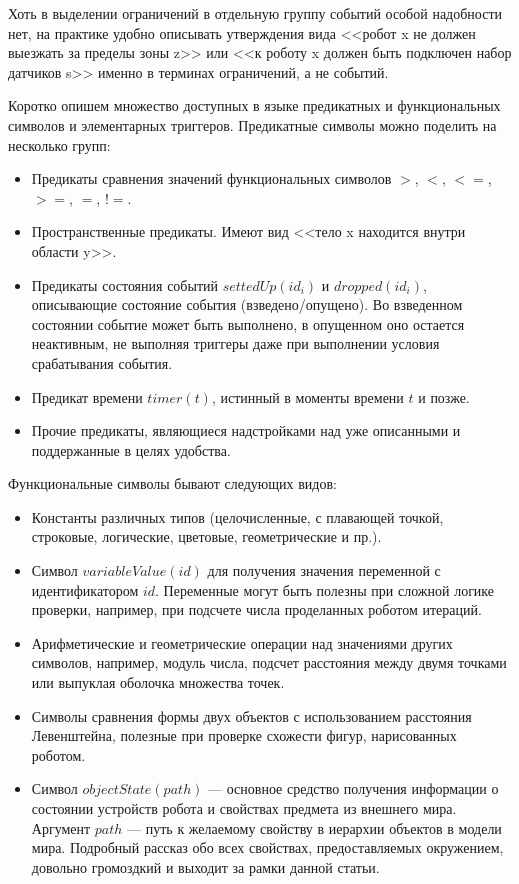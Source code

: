 \documentclass[conference]{IEEEtran}
\begin{document}
Хоть в выделении ограничений в отдельную группу событий особой надобности нет, на практике удобно описывать 
утверждения вида <<робот x не должен выезжать за пределы зоны z>> или <<к роботу x должен быть подключен набор датчиков s>>
именно в терминах ограничений, а не событий.

Коротко опишем множество доступных в языке предикатных и функциональных символов и элементарных триггеров. 
Предикатные символы можно поделить на несколько групп:
\begin{itemize}
	\item Предикаты сравнения значений функциональных символов $>$, $<$, $<=$, $>=$, $=$, $!=$.
	\item Пространственные предикаты. Имеют вид <<тело x находится внутри области y>>.
	\item Предикаты состояния событий $settedUp(id_i)$ и $dropped(id_i)$, описывающие состояние события 
			(взведено/опущено). Во взведенном состоянии событие может быть выполнено, в опущенном оно 
			остается неактивным, не выполняя триггеры даже при выполнении условия срабатывания события.
	\item Предикат времени $timer(t)$, истинный в моменты времени $t$ и позже.
	\item Прочие предикаты, являющиеся надстройками над уже описанными и поддержанные в целях удобства.
\end{itemize}

Функциональные символы бывают следующих видов:
\begin{itemize}
	\item Константы различных типов (целочисленные, с плавающей точкой, строковые, логические, цветовые, геометрические и пр.).
	\item Символ $variableValue(id)$ для получения значения переменной с идентификатором $id$. Переменные 
			могут быть полезны при сложной логике проверки, например, при подсчете числа проделанных роботом итераций.
	\item Арифметические и геометрические операции над значениями других символов, например, модуль числа, 
			подсчет расстояния между двумя точками или выпуклая оболочка множества точек.
	\item Символы сравнения формы двух объектов с использованием расстояния Левенштейна, полезные при 
			проверке схожести фигур, нарисованных роботом.
	\item Символ $objectState(path)$ --- основное средство получения информации о состоянии устройств 
			робота и свойствах предмета из внешнего мира. Аргумент $path$ --- путь к желаемому свойству 
			в иерархии объектов в модели мира. Подробный рассказ обо всех свойствах, предоставляемых окружением, 
			довольно громоздкий и выходит за рамки данной статьи.
\end{itemize}
\end{document}
